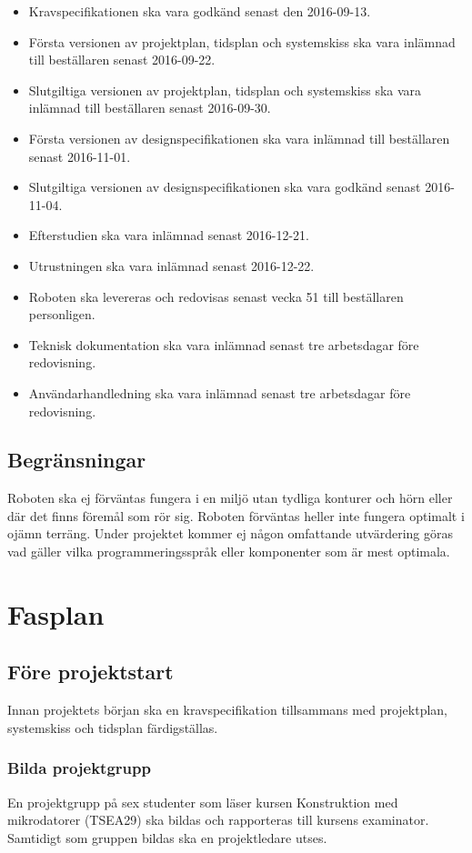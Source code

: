 \documentclass{article}
\begin{document}
\begin{itemize}
    \item Kravspecifikationen ska vara godkänd senast den 2016-09-13. 
    \item Första versionen av projektplan, tidsplan och systemskiss ska vara inlämnad till beställaren senast 2016-09-22. 
    \item Slutgiltiga versionen av projektplan, tidsplan och systemskiss ska vara inlämnad till beställaren senast 2016-09-30. 
    \item Första versionen av designspecifikationen ska vara inlämnad till beställaren senast 2016-11-01. 
    \item Slutgiltiga versionen av designspecifikationen ska vara godkänd senast 2016-11-04.
    \item Efterstudien ska vara inlämnad senast 2016-12-21. 
    \item Utrustningen ska vara inlämnad senast 2016-12-22.
    \item Roboten ska levereras och redovisas senast vecka 51 till beställaren personligen.
    \item Teknisk dokumentation ska vara inlämnad senast tre arbetsdagar före redovisning.
    \item Användarhandledning ska vara inlämnad senast tre arbetsdagar före redovisning.
\end{itemize}


\subsection{Begränsningar}
Roboten ska ej förväntas fungera i en miljö utan tydliga konturer och hörn eller där det finns föremål som rör sig. Roboten förväntas heller inte fungera optimalt i ojämn terräng. Under projektet kommer ej någon omfattande utvärdering göras vad gäller vilka programmeringsspråk eller komponenter som är mest optimala.

\section{Fasplan}

\subsection{Före projektstart}
Innan projektets början ska en kravspecifikation tillsammans med projektplan, systemskiss och tidsplan färdigställas.

\subsubsection{Bilda projektgrupp}
En projektgrupp på sex studenter som läser kursen Konstruktion med mikrodatorer (TSEA29) ska bildas och rapporteras till kursens examinator. Samtidigt som gruppen bildas ska en projektledare utses.
   
\end{document}
